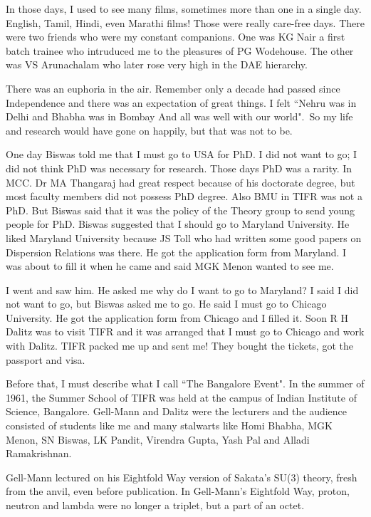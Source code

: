 In those days, I used to see many films, sometimes more than one in a 
single day. English, Tamil, Hindi, even Marathi films! Those were really 
care-free days. There were two friends who were my constant companions. 
One was KG Nair a first batch trainee who intruduced me to the pleasures 
of PG Wodehouse. The other was VS Arunachalam who later rose very high 
in the DAE hierarchy.

There was an euphoria in the air. Remember only a decade had passed since Independence and there was an expectation of great things. I felt ``Nehru was in Delhi and Bhabha was in Bombay And all was well with our world".\ So my life and research would have gone on happily, but that was not to be.

One day Biswas told me that I must go to USA for PhD. I did not want to 
go; I did not think PhD was necessary for research. Those days PhD was 
a rarity. In MCC. Dr MA Thangaraj had great respect because of his 
doctorate degree, but most faculty members did not possess PhD degree. 
Also BMU in TIFR was not a PhD. But Biswas said that it was the policy 
of the Theory group to send young people for PhD. Biswas suggested that 
I should go to Maryland University. He liked Maryland University because 
JS Toll who had written some good papers on Dispersion Relations was 
there. He got the application form from Maryland. I was about to fill it 
when he came and said MGK Menon wanted to see me.

I went and saw him. He asked me why do I want to go to Maryland? I said 
I did not want to go, but Biswas asked me to go. He said I must go to 
Chicago University. He got the application form from Chicago and I 
filled it. Soon R H Dalitz was to visit TIFR and it was arranged that I 
must go to Chicago and work with Dalitz. TIFR packed me up and sent me! 
They bought the tickets, got the passport and visa.

Before that, I must describe what I call ``The Bangalore Eve\-nt". In the 
summer of 1961, the Summer School of TIFR was held at the campus of 
Indian Institute of Science, Bangalore. Gell-Mann and Dalitz were the 
lecturers and the audience consisted of students like me and many 
stalwarts like Homi Bhabha, MGK Menon, SN Biswas, LK Pandit, Virendra 
Gupta, Yash Pal and Alla\-di Ramakrishnan.

Gell-Mann lectured on his Eightfold Way version of Sakata's SU(3) 
theory, fresh from the anvil, even before publication. In Gell-Mann's 
Eightfold Way, proton, neutron and lambda were no longer a triplet, but 
a part of an octet.
 
